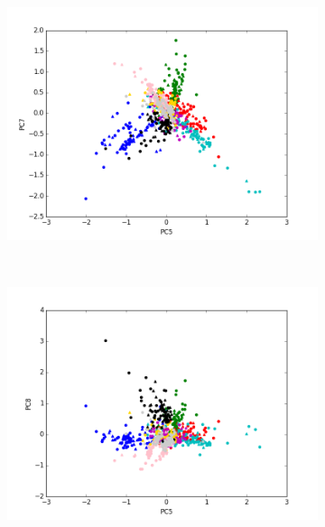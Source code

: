 \begin{figure}[ht!]	
	\begin{subfigure}[b]{0.5\textwidth}
		\includegraphics[width=\linewidth]{img/sanger/9dim-pc5-pc7.png}
	\end{subfigure}%
	~
	\begin{subfigure}[b]{0.5\textwidth}
		\includegraphics[width=\linewidth]{img/sanger/9dim-pc5-pc8.png}
	\end{subfigure}%
	\\
	\centering
	\begin{subfigure}[b]{0.5\textwidth}

\end{subfigure}
\end{figure}
